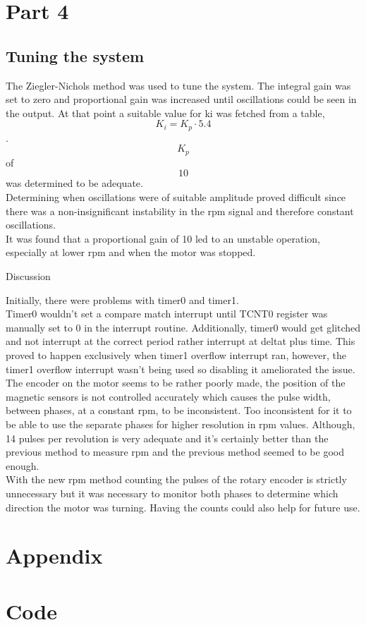 \documentclass{article}
\begin{document}
\section*{Part 4}


\subsection{Tuning the system} 

The Ziegler-Nichols method was used to tune the system. The integral gain was set to zero and proportional gain was increased until oscillations could be seen in the output. At that point a suitable value for ki was fetched from a table, $$K_i=K_p \cdot 5.4$$. $$K_p$$ of $$10$$ was determined to be adequate. 
\\
Determining when oscillations were of suitable amplitude proved difficult since there was a non-insignificant instability in the rpm signal and therefore constant oscillations. 
\\
It was found that a proportional gain of 10 led to an unstable operation, especially at lower rpm and when the motor was stopped. 

Discussion

Initially, there were problems with timer0 and timer1. 
\\
Timer0 wouldn't set a compare match interrupt until TCNT0 register was manually set to 0 in the interrupt routine. Additionally, timer0 would get glitched and not interrupt at the correct period rather interrupt at deltat plus time. This proved to happen exclusively when timer1 overflow interrupt ran, however, the timer1 overflow interrupt wasn't being used so disabling it ameliorated the issue.
\\
The encoder on the motor seems to be rather poorly made, the position of the magnetic sensors is not controlled accurately which causes the pulse width, between phases, at a constant rpm, to be inconsistent. Too inconsistent for it to be able to use the separate phases for higher resolution in rpm values. Although, 14 pulses per revolution is very adequate and it's certainly better than the previous method to measure rpm and the previous method seemed to be good enough. 
\\
With the new rpm method counting the pulses of the rotary encoder is strictly unnecessary but it was necessary to monitor both phases to determine which direction the motor was turning. Having the counts could also help for future use. 
\newpage
\section*{Appendix}
\appendix

\newpage
\section{Code}\label{appendix:code}






\end{document}
